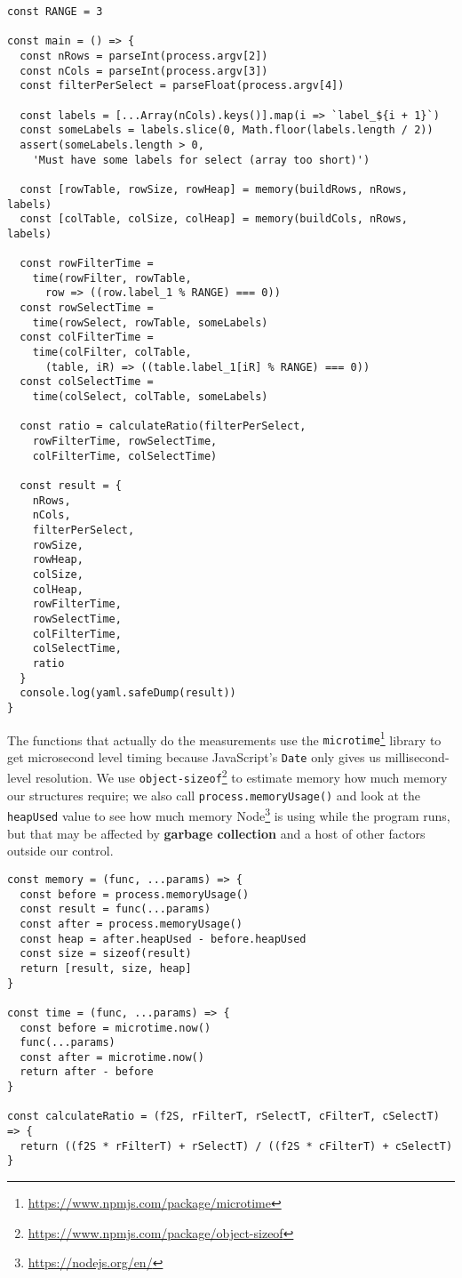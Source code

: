 \documentclass[krantzl]{krantz}
\newcommand{\glossref}[1]{\textbf{#1}}
\newcommand{\hreffoot}[2]{{#1}\footnote{\href{#2}{#2}}}
\begin{document}
\begin{lstlisting}[frame=single,frameround=tttt]
const RANGE = 3

const main = () => {
  const nRows = parseInt(process.argv[2])
  const nCols = parseInt(process.argv[3])
  const filterPerSelect = parseFloat(process.argv[4])

  const labels = [...Array(nCols).keys()].map(i => `label_${i + 1}`)
  const someLabels = labels.slice(0, Math.floor(labels.length / 2))
  assert(someLabels.length > 0,
    'Must have some labels for select (array too short)')

  const [rowTable, rowSize, rowHeap] = memory(buildRows, nRows, labels)
  const [colTable, colSize, colHeap] = memory(buildCols, nRows, labels)

  const rowFilterTime =
    time(rowFilter, rowTable,
      row => ((row.label_1 % RANGE) === 0))
  const rowSelectTime =
    time(rowSelect, rowTable, someLabels)
  const colFilterTime =
    time(colFilter, colTable,
      (table, iR) => ((table.label_1[iR] % RANGE) === 0))
  const colSelectTime =
    time(colSelect, colTable, someLabels)

  const ratio = calculateRatio(filterPerSelect,
    rowFilterTime, rowSelectTime,
    colFilterTime, colSelectTime)

  const result = {
    nRows,
    nCols,
    filterPerSelect,
    rowSize,
    rowHeap,
    colSize,
    colHeap,
    rowFilterTime,
    rowSelectTime,
    colFilterTime,
    colSelectTime,
    ratio
  }
  console.log(yaml.safeDump(result))
}
\end{lstlisting}



The functions that actually do the measurements
use the \hreffoot{\texttt{microtime}}{https://www.npmjs.com/package/microtime} library to get microsecond level timing
because JavaScript's \texttt{Date} only gives us millisecond-level resolution.
We use \hreffoot{\texttt{object-sizeof}}{https://www.npmjs.com/package/object-sizeof} to estimate memory how much memory our structures require;
we also call \texttt{process.memoryUsage()} and look at the \texttt{heapUsed} value
to see how much memory \hreffoot{Node}{https://nodejs.org/en/} is using while the program runs,
but that may be affected by \glossref{garbage collection}
and a host of other factors outside our control.


\begin{lstlisting}[frame=single,frameround=tttt]
const memory = (func, ...params) => {
  const before = process.memoryUsage()
  const result = func(...params)
  const after = process.memoryUsage()
  const heap = after.heapUsed - before.heapUsed
  const size = sizeof(result)
  return [result, size, heap]
}

const time = (func, ...params) => {
  const before = microtime.now()
  func(...params)
  const after = microtime.now()
  return after - before
}

const calculateRatio = (f2S, rFilterT, rSelectT, cFilterT, cSelectT) => {
  return ((f2S * rFilterT) + rSelectT) / ((f2S * cFilterT) + cSelectT)
}
\end{lstlisting}
\end{document}
